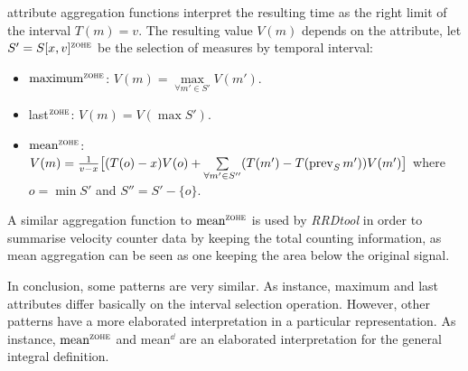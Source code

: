 \zohe{} attribute aggregation functions interpret the resulting time
as the right limit of the interval $T(m)=v$. The resulting value
$V(m)$ depends on the attribute, let $S'=S[x,v]^\zohe{}$ be the
selection of measures by \zohe{} temporal interval:
\begin{itemize}
\item $\maxz$: $V(m) = \max\limits_{\forall m' \in S'} V(m')$. 
\item last$^\zohe{}$: $V(m) = V(\max S')$.
\item $\meanz$: $V(m) = \frac{1}{v-x} \big[ (T(o)-x)V(o) +
  \sum\limits_{\forall m' \in S''}( T(m')- T(\operatorname*{prev}_S
  m') )V(m') \big]$ where $o=\min S'$ and $S''= S' - \{o\}$.
\end{itemize}

A similar aggregation function to $\meanz$ is used by \emph{RRDtool}
\cite{rrdtool} in order to summarise velocity coun\-ter
data by keeping the total counting information, as mean aggregation
can be seen as one keeping the area below the original signal.


In conclusion, some patterns are very similar. As instance, maximum
and last attributes differ basically on the interval selection
operation. However, other patterns have a more elaborated
interpretation in a particular representation. As instance, $\meanz$
and mean$^\dd$ are an elaborated interpretation for the general
integral definition.




